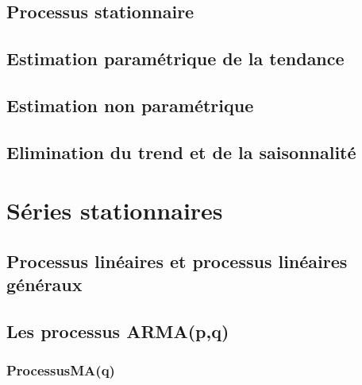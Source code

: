 \documentclass[
]{book}
\theoremstyle{definition}
\theoremstyle{definition}
\theoremstyle{definition}
\theoremstyle{definition}
\theoremstyle{remark}
\begin{document}
\hypertarget{processus-stationnaire}{%
\section{Processus stationnaire}\label{processus-stationnaire}}

\hypertarget{estimation-paramuxe9trique-de-la-tendance}{%
\section{Estimation paramétrique de la tendance}\label{estimation-paramuxe9trique-de-la-tendance}}

\hypertarget{estimation-non-paramuxe9trique}{%
\section{Estimation non paramétrique}\label{estimation-non-paramuxe9trique}}

\hypertarget{elimination-du-trend-et-de-la-saisonnalituxe9}{%
\section{Elimination du trend et de la saisonnalité}\label{elimination-du-trend-et-de-la-saisonnalituxe9}}

\hypertarget{series-stat}{%
\chapter{Séries stationnaires}\label{series-stat}}

\hypertarget{processus-linuxe9aires-et-processus-linuxe9aires-guxe9nuxe9raux}{%
\section{Processus linéaires et processus linéaires généraux}\label{processus-linuxe9aires-et-processus-linuxe9aires-guxe9nuxe9raux}}

\hypertarget{les-processus-armapq}{%
\section{Les processus ARMA(p,q)}\label{les-processus-armapq}}

\hypertarget{processusmaq}{%
\subsection{ProcessusMA(q)}\label{processusmaq}}
\end{document}
